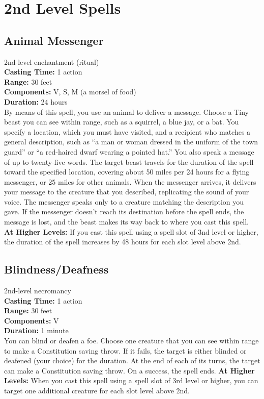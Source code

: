 \documentclass[11pt, A4paper, english]{article}
\begin{document}
	\section{2nd Level Spells}
		\subsection{Animal Messenger}
2nd-level enchantment (ritual) \\
\textbf{Casting Time:} 1 action \\
\textbf{Range:} 30 feet \\
\textbf{Components:} V, S, M (a morsel of food) \\
\textbf{Duration:} 24 hours \\
By means of this spell, you use an animal to deliver a message. Choose a Tiny beast you can see within range, such as a squirrel, a blue jay, or a bat. You specify a location, which you must have visited, and a recipient who matches a general description, such as “a man or woman dressed in the uniform of the town guard” or “a red-haired dwarf wearing a pointed hat.” You also speak a message of up to twenty-five words. The target beast travels for the duration of the spell toward the specified location, covering about 50 miles per 24 hours for a flying messenger, or 25 miles for other animals. When the messenger arrives, it delivers your message to the creature that you described, replicating the sound of your voice. The messenger speaks only to a creature matching the description you gave. If the messenger doesn’t reach its destination before the spell ends, the message is lost, and the beast makes its way back to where you cast this spell. \\
\textbf{At Higher Levels:} If you cast this spell using a spell slot of 3nd level or higher, the duration of the spell increases by 48 hours for each slot level above 2nd.

		\subsection{Blindness/Deafness}
2nd-level necromancy \\
\textbf{Casting Time:} 1 action \\
\textbf{Range:} 30 feet \\
\textbf{Components:} V \\
\textbf{Duration:} 1 minute \\
You can blind or deafen a foe. Choose one creature that you can see within range to make a Constitution saving throw. If it fails, the target is either blinded or deafened (your choice) for the duration. At the end of each of its turns, the target can make a Constitution saving throw. On a success, the spell ends.
\textbf{At Higher Levels:} When you cast this spell using a spell slot of 3rd level or higher, you can target one additional creature for each slot level above 2nd.
\end{document}
